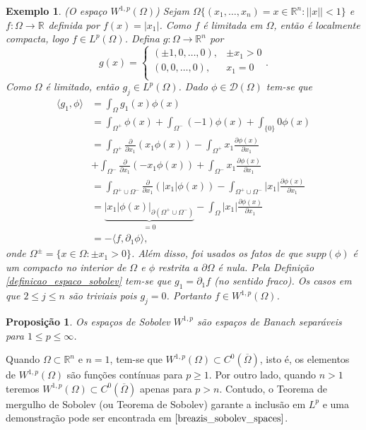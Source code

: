 \documentclass[12pt]{book}
\newtheorem{exemplo}[teorema]{Exemplo}
\newtheorem{proposicao}[teorema]{Proposição}
\newcommand{\derivadaparcial}[2]{\frac{\partial #1}{\partial #2}}
\newcommand{\derivadaparcialabrev}[1]{\partial_{#1}}
\newcommand{\espacoLp}[1]{L^{p}(#1)}
\newcommand{\espacosobolev}[1]{W^{1,p}(#1)}
\newcommand{\espacosobolevgeral}[2]{W^{1,#1}(#2)}
\newcommand{\funcaocond}[5]{
	#1 = 
	\left\{
	\begin{array}{cc}
		#2, & #3\\
		#4, & #5\\
	\end{array}
	\right.
}
\newcommand{\funcoesteste}{\mathcal{D}(\Omega)}
\newcommand{\norma}[1]{||#1||}
\newcommand{\produtointerno}[2]{\langle #1, #2 \rangle}
\newcommand{\real}[1]{\mathbb{R}^{#1}}
\newcommand{\reta}{\real{}}
\begin{document}
	\begin{exemplo}
		(O espaço $\espacosobolevgeral{p}{\Omega}$) Sejam $\Omega \{(x_{1}, \dots, x_{n})=x \in \real{n}: \norma{x}<1 \}$ e $f:\Omega\to \reta$ definida por $f(x) = |x_{1}|$. Como $f$ é limitada em $\Omega$, então é localmente compacta, logo $f \in \espacoLp{\Omega}$. Defina $g:\Omega\to \real{n}$ por
		$$
		\funcaocond{g(x)}{(\pm 1, 0, \dots, 0)}{\pm x_{1}>0}{(0, 0, \dots, 0)}{x_{1} = 0}.
		$$
		Como $\Omega$ é limitado, então $g_{j}\in \espacoLp{\Omega}$. Dado $\phi \in \funcoesteste$ tem-se que
		$$
		\begin{aligned}
		\produtointerno{g_{1}}{\phi} 
		&= \int_{\Omega}g_{1}(x)\phi(x)
		\\
		&=\int_{\Omega^{+}}\phi(x)+\int_{\Omega^{-}}(-1)\phi(x)+\int_{\{0\}}0\phi(x)
		\\ &=\int_{\Omega^{+}}\derivadaparcial{}{x_{1}}(x_{1}\phi(x)) - \int_{\Omega^{+}}x_{1}\derivadaparcial{\phi(x)}{x_{1}}
		\\
		&+\int_{\Omega^{-}}\derivadaparcial{}{x_{1}}(-x_{1}\phi(x)) + \int_{\Omega^{-}}x_{1}\derivadaparcial{\phi(x)}{x_{1}}
		\\ 
		&=
		\int_{\Omega^{+}\cup \Omega^{-}}\derivadaparcial{}{x_{1}}(|x_{1}|\phi(x)) - \int_{\Omega^{+}\cup \Omega^{-}}|x_{1}|\derivadaparcial{\phi(x)}{x_{1}}
		\\
		&=
		\underbrace{|x_{1}|\phi(x)\Big|_{\partial(\Omega^{+}\cup \Omega^{-})}}_{=0} - \int_{\Omega}|x_{1}|\derivadaparcial{\phi(x)}{x_{1}}
		\\
		&=
		-\produtointerno{f}{\derivadaparcialabrev{1}\phi},
		\end{aligned}
		$$
		onde $\Omega^{\pm} = \{x \in \Omega: \pm x_{1} >0\}$. Além disso, foi usados os fatos de que $supp(\phi) $ é um compacto no interior de $\Omega$ e $\phi$ restrita a $\partial \Omega$ é nula. Pela Definição \ref{definicao_espaco_sobolev} tem-se que $g_{1} = \derivadaparcialabrev{1}f$ (no sentido fraco). Os casos em que $2\leq j\leq n$ são triviais pois $g_{j} = 0$. Portanto $f\in \espacosobolev{\Omega}$.
	\end{exemplo}
	
	
	\begin{proposicao}
		Os espaços de Sobolev $W^{1,p}$ são espaços de Banach separáveis para $1\leq p \leq \infty$.
	\end{proposicao}
	
	Quando $\Omega\subset\real{n}$ e $n=1$, tem-se que $\espacosobolev{\Omega} \subset C^{0}(\overline{\Omega})$, isto é, os elementos de $\espacosobolev{\Omega}$ são funções contínuas para $p \geq 1$. Por outro lado, quando $n>1$ teremos $\espacosobolev{\Omega} \subset C^{0}(\overline{\Omega})$ apenas para $p>n$. Contudo, o Teorema de mergulho de Sobolev (ou Teorema de Sobolev) garante a inclusão em $L^{p}$ e uma demonstração pode ser encontrada em $\cite{breazis_sobolev_spaces}$.	
	
\end{document}
